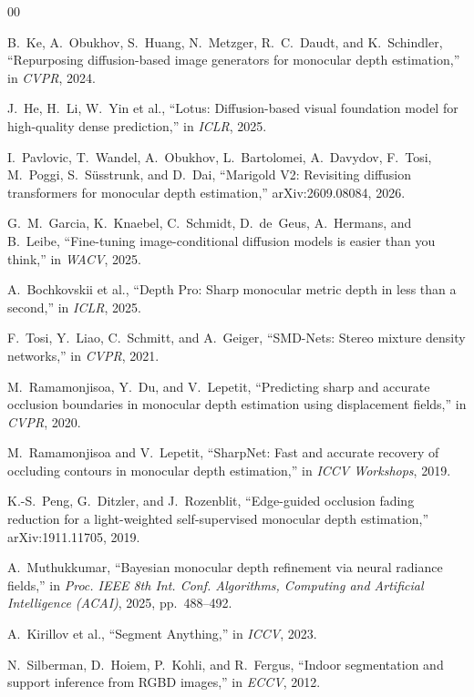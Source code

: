 \documentclass[conference]{IEEEtran}
\begin{document}
\begin{thebibliography}{00}

 B.~Ke, A.~Obukhov, S.~Huang, N.~Metzger, R.~C.~Daudt, and
K.~Schindler, ``Repurposing diffusion-based image generators for monocular depth
estimation,'' in \emph{CVPR}, 2024.

 J.~He, H.~Li, W.~Yin et al., ``Lotus: Diffusion-based visual
foundation model for high-quality dense prediction,'' in \emph{ICLR}, 2025.

 I.~Pavlovic, T.~Wandel, A.~Obukhov, L.~Bartolomei,
A.~Davydov, F.~Tosi, M.~Poggi, S.~S{\"u}sstrunk, and D.~Dai, ``Marigold V2:
Revisiting diffusion transformers for monocular depth estimation,''
arXiv:2609.08084, 2026.

 G.~M.~Garcia, K.~Knaebel, C.~Schmidt, D.~de~Geus,
A.~Hermans, and B.~Leibe, ``Fine-tuning image-conditional diffusion models is
easier than you think,'' in \emph{WACV}, 2025.

 A.~Bochkovskii et al., ``Depth Pro: Sharp monocular metric
depth in less than a second,'' in \emph{ICLR}, 2025.

 F.~Tosi, Y.~Liao, C.~Schmitt, and A.~Geiger, ``SMD-Nets:
Stereo mixture density networks,'' in \emph{CVPR}, 2021.

 M.~Ramamonjisoa, Y.~Du, and V.~Lepetit, ``Predicting
sharp and accurate occlusion boundaries in monocular depth estimation using
displacement fields,'' in \emph{CVPR}, 2020.

 M.~Ramamonjisoa and V.~Lepetit, ``SharpNet: Fast and accurate
recovery of occluding contours in monocular depth estimation,'' in \emph{ICCV
Workshops}, 2019.

 K.-S.~Peng, G.~Ditzler, and J.~Rozenblit, ``Edge-guided
occlusion fading reduction for a light-weighted self-supervised monocular depth
estimation,'' arXiv:1911.11705, 2019.

 A.~Muthukkumar, ``Bayesian monocular depth refinement via
neural radiance fields,'' in \emph{Proc. IEEE 8th Int. Conf. Algorithms,
Computing and Artificial Intelligence (ACAI)}, 2025, pp.~488--492.

 A.~Kirillov et al., ``Segment Anything,'' in \emph{ICCV}, 2023.

 N.~Silberman, D.~Hoiem, P.~Kohli, and R.~Fergus, ``Indoor
segmentation and support inference from RGBD images,'' in \emph{ECCV}, 2012.


\end{thebibliography}
\end{document}
